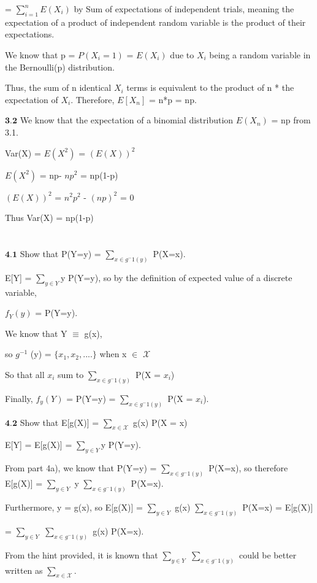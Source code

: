 =  $\sum_{i=1}^nE({X_i})$ by Sum of expectations of independent trials, meaning the expectation of a product of independent random variable is the product of their expectations.

We know that p = $P(X_i = 1)$ = $E(X_i)$ due  to $X_i$ being a random variable in the Bernoulli(p) distribution.

Thus, the sum of n identical $X_i$ terms is equivalent to the product of n * the expectation of $X_i$. Therefore, $E[X_n]$ = n*p = np.

$\textbf{3.2}$ We know that the expectation of a binomial distribution $E(X_n)$ = np from 3.1.

Var(X) = $E(X^2)$ = $(E(X))^2$

$E(X^2)$ = np- $np^2$ = np(1-p)

$(E(X))^2$ = $n^2p^2$ - $(np)^2$ = 0

Thus Var(X) = np(1-p)


\newpage
\section{}

$\textbf{4.1}$ Show that P(Y=y) = $\sum_{x\in g^-1(y)}$ P(X=x).

E[Y] = $\sum_{y\in Y}$y P(Y=y), so by the definition of expected value of a discrete variable, 

$f_Y(y)$ = P(Y=y).

We know that Y $\equiv$ g(x), 

so $g^{-1}$ (y) = $\{x_1,x_2,....\}$ when x $\in$ $\mathcal{X}$

So that all $x_i$ sum to $\sum_{x\in g^-1(y)}$ P(X = $x_i$)

Finally, $f_y(Y)$ = P(Y=y) = $\sum_{x\in g^-1(y)}$ P(X = $x_i$).


$\textbf{4.2}$ Show that E[g(X)] = $\sum_{x\in \mathcal{X}}$ g(x) P(X = x)

E[Y] = E[g(X)] = $\sum_{y\in Y}$y P(Y=y).

From part 4a), we know that P(Y=y) = $\sum_{x\in g^-1(y)}$ P(X=x), so therefore E[g(X)] = $\sum_{y\in Y}$ y $\sum_{x\in g^-1(y)}$ P(X=x). 

Furthermore, y = g(x), so  E[g(X)] = $\sum_{y\in Y}$ g(x) $\sum_{x\in g^-1(y)}$ P(X=x) = E[g(X)] 

= $\sum_{y\in Y}$ $\sum_{x\in g^-1(y)}$  g(x) P(X=x).

From the hint provided, it is known that $\sum_{y\in Y}$ $\sum_{x\in g^-1(y)}$ could be better written as $\sum_{x\in \mathcal{X}}$.

